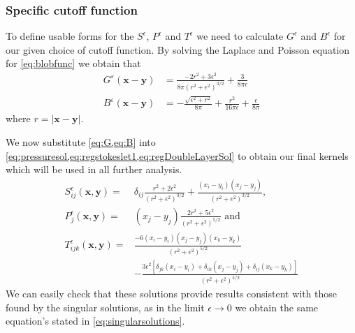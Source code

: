\subsubsection{Specific cutoff function}
To define usable forms for the $S^\epsilon$, $P^\epsilon$ and $T^\epsilon$ we need to calculate $G^\epsilon$ and $B^\epsilon$ for our given choice of cutoff function. By solving the Laplace and Poisson equation for \cref{eq:blobfunc} we obtain that 
\begin{subequations}
\begin{align}
    G^\varepsilon(\bm{x}-\bm{y}) &= \frac{-2r^2+3\epsilon^2}{8\pi(r^2+\epsilon^2)^{3/2}} + \frac{3}{8\pi\epsilon} \label{eq:G}\\
    B^\varepsilon(\bm{x}-\bm{y}) &= -\frac{\sqrt{\epsilon^2+r^2}}{8\pi} + \frac{r^2}{16\pi\epsilon} + \frac{\epsilon}{8\pi}\label{eq:B}
\end{align}
\end{subequations}
where $r=|\bm{x}-\bm{y}|$.

We now substitute \cref{eq:G,eq:B} into \cref{eq:pressuresol,eq:regstokeslet1,eq:regDoubleLayerSol} to obtain our final kernels which will be used in all further analysis.
\begin{subequations}
\begin{align}
    S_{ij}^\epsilon(\bm{x}, \bm{y}) =& \delta_{ij} \frac{r^2+2\epsilon^2}{\left( r^2 + \epsilon^2 \right)^{3/2}} + \frac{(x_i-y_{i})(x_j-y_{j})}{\left( r^2 + \epsilon^2 \right)^{3/2}}, \label{eq:regstokeslet2} \\
    P_j^\epsilon(\bm{x}, \bm{y}) =& (x_j-y_{j})\frac{2r^2+5\epsilon^2}{(r^2+\epsilon^2)^{5/2}} \text{ and } \label{eq:pressuresol2} \\
    T_{ijk}^\epsilon(\bm{x}, \bm{y}) =& \frac{-6(x_i-y_{i})(x_j-y_{j})(x_k-y_{k})}{(r^2+\epsilon^2)^{5/2}} \label{eq:doublelayer2}\\
    &-\frac{3\epsilon^2[\delta_{jk}(x_i-y_{i}) +\delta_{ik}(x_j-y_{j})+\delta_{ij}(x_k-y_{k})]}{(r^2+\epsilon^2)^{5/2}} \nonumber
\end{align}
\end{subequations}
We can easily check that these solutions provide results consistent with those found by the singular solutions, as in the limit $\epsilon \to 0$ we obtain the same equation's stated in \cref{eq:singularsolutions}.

